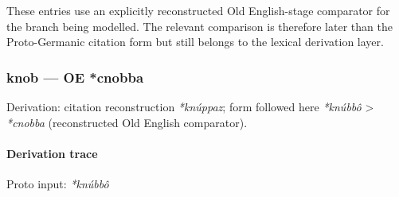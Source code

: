 \documentclass[
  british,
  a4paper,
]{article}
\begin{document}
These entries use an explicitly reconstructed Old English-stage
comparator for the branch being modelled. The relevant comparison is
therefore later than the Proto-Germanic citation form but still belongs
to the lexical derivation layer.

\subsubsection{knob --- OE *cnobba}\label{knob-oe-cnobba}

Derivation: citation reconstruction \emph{*knúppaz}; form followed here
\emph{*knúbbô} \textgreater{} \emph{*cnobba} (reconstructed Old English
comparator).

\paragraph{Derivation trace}\label{derivation-trace-67}

Proto input: \emph{*knúbbô}

\begingroup
\setlength{\fboxsep}{6pt}
\end{document}
